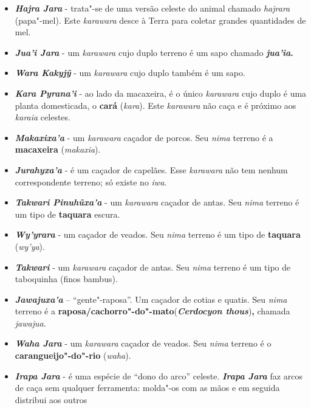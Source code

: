 \begin{itemize}
  \emph{karawara} caça tatus. O mais importante desse \emph{karawara} é
  o fato de ser ele o responsável por ressuscitar os humanos ao chegarem
  no céu após a morte terrena (veremos a relação entre a morte e os
  \emph{karawara} mais adiante).
\item
  \emph{\textbf{Hajra Jara}} - trata"-se de uma versão celeste do animal
  chamado \emph{hajrara} (papa"-mel). Este \emph{karawara} desce à Terra
  para coletar grandes quantidades de mel.
\item
  \emph{\textbf{Jua'i Jara}} - um \emph{karawara} cujo duplo terreno é
  um sapo chamado \textbf{\emph{jua'ia}.}
\item
  \emph{\textbf{Wara Kakyjỹ}} - um \emph{karawara} cujo duplo também é
  um sapo.
\item
  \emph{\textbf{Kara Pyrana'i}} - ao lado da macaxeira, é o único
  \emph{karawara} cujo duplo é uma planta domesticada, o \textbf{cará}
  (\emph{kara}). Este \emph{karawara} não caça e é próximo aos
  \emph{karaia} celestes.
\item
  \emph{\textbf{Makaxixa'a}} - um \emph{karawara} caçador de porcos. Seu
  \emph{nima} terreno é a \textbf{macaxeira} (\emph{makaxia}).
\item
  \emph{\textbf{Jurahyxa'a}} - é um caçador de capelães. Esse
  \emph{karawara} não tem nenhum correspondente terreno; só existe no
  \emph{iwa}.
\item
  \emph{\textbf{Takwari Pinuhũxa'a}} - um \emph{karawara} caçador de
  antas. Seu \emph{nima} terreno é um tipo de \textbf{taquara} escura.
\item
  \emph{\textbf{Wy'yrara}} - um caçador de veados. Seu \emph{nima}
  terreno é um tipo de \textbf{taquara} (\emph{wy'ya}).
\item
  \emph{\textbf{Takwari}} - um \emph{karawara} caçador de antas. Seu
  \emph{nima} terreno é um tipo de taboquinha (finos bambus).
\item
  \emph{\textbf{Jawajuxa'a}} -- ``gente"-raposa''. Um caçador de cotias e
  quatis. Seu \emph{nima} terreno é a
  \textbf{raposa/cachorro"-do"-mato}(\emph{\textbf{Cerdocyon
  thous}})\textbf{,} chamada \emph{jawajua}.
\item
  \emph{\textbf{Waha Jara}} - um \emph{karawara} caçador de veados. Seu
  \emph{nima} terreno é o \textbf{carangueijo"-do"-rio} (\emph{waha}).
\item
  \emph{\textbf{Irapa Jara}} - é uma espécie de ``dono do arco'' celeste.
  \emph{\textbf{Irapa Jara}} faz arcos de caça sem qualquer ferramenta:
  molda"-os com as mãos e em seguida distribui aos outros

\end{itemize}
